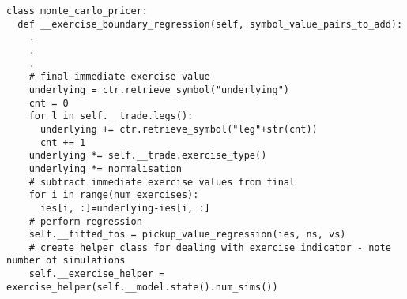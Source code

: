 \begin{verbatim}
class monte_carlo_pricer:
  def __exercise_boundary_regression(self, symbol_value_pairs_to_add):
    .
    .
    .
    # final immediate exercise value
    underlying = ctr.retrieve_symbol("underlying")
    cnt = 0
    for l in self.__trade.legs():
      underlying += ctr.retrieve_symbol("leg"+str(cnt))         
      cnt += 1          
    underlying *= self.__trade.exercise_type()   
    underlying *= normalisation
    # subtract immediate exercise values from final
    for i in range(num_exercises):
      ies[i, :]=underlying-ies[i, :]   
    # perform regression
    self.__fitted_fos = pickup_value_regression(ies, ns, vs)
    # create helper class for dealing with exercise indicator - note number of simulations
    self.__exercise_helper = exercise_helper(self.__model.state().num_sims()) 
\end{verbatim}

